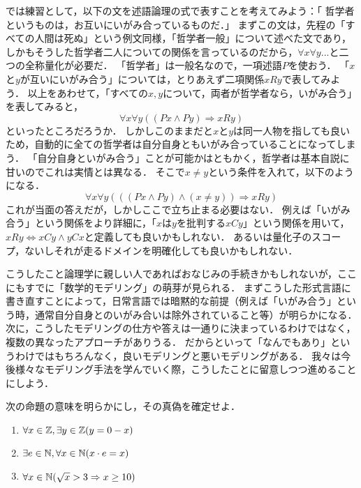\documentclass[11pt,a4paper]{jsarticle}
\begin{document}
では練習として，以下の文を述語論理の式で表すことを考えてみよう：「 哲学者というものは，お互いにいがみ合っているものだ．」
まずこの文は，先程の「すべての人間は死ぬ」という例文同様，「哲学者一般」について述べた文であり，しかもそうした哲学者二人についての関係を言っているのだから，$\forall x \forall y...$と二つの全称量化が必要だ．
「哲学者」は一般名なので，一項述語$P$を使おう．
「$x$と$y$が互いにいがみ合う」については，とりあえず二項関係$xRy$で表してみよう．
以上をあわせて，「すべての$x, y$について，両者が哲学者なら，いがみ合う」を表してみると，
\begin{equation}
 \forall x \forall y ((Px \wedge Py) \Rightarrow xRy)
\end{equation}
といったところだろうか．
しかしこのままだと$x$と$y$は同一人物を指しても良いため，自動的に全ての哲学者は自分自身ともいがみ合っていることになってしまう．
「自分自身といがみ合う」ことが可能かはともかく，哲学者は基本自説に甘いのでこれは実情とは異なる．
そこで$x \neq y$という条件を入れて，以下のようになる．
\begin{equation}
 \forall x \forall y (((Px \wedge Py) \wedge (x \neq y)) \Rightarrow xRy)
\end{equation}
これが当面の答えだが，しかしここで立ち止まる必要はない．
例えば「いがみ合う」という関係をより詳細に，「$x$は$y$を批判する$xCy$」という関係を用いて，$xRy \Leftrightarrow xCy \wedge yCx$と定義しても良いかもしれない．
あるいは量化子のスコープ，ないしそれが走るドメインを明確化しても良いかもしれない．

こうしたこと論理学に親しい人であればおなじみの手続きかもしれないが，ここにもすでに「数学的モデリング」の萌芽が見られる．
まずこうした形式言語に書き直すことによって，日常言語では暗黙的な前提（例えば「いがみ合う」という時，通常自分自身とのいがみ合いは除外されていること等）が明らかになる．
次に，こうしたモデリングの仕方や答えは一通りに決まっているわけではなく，複数の異なったアプローチがありうる．
だからといって「なんでもあり」というわけではもちろんなく，良いモデリングと悪いモデリングがある．
我々は今後様々なモデリング手法を学んでいく際，こうしたことに留意しつつ進めることにしよう．


\begin{exercise}
 次の命題の意味を明らかにし，その真偽を確定せよ．
\begin{enumerate}
 \item $\forall x \in \mathbb{Z}, \exists y \in \mathbb{Z} (y = 0 - x)$
 \item $\exists e \in \mathbb{N}, \forall x \in \mathbb{N} (x \cdot e = x)$
 \item $\forall x \in \mathbb{N} (\sqrt{x} > 3 \Rightarrow x \geq 10)$
\end{enumerate}
\end{exercise}
\end{document}
